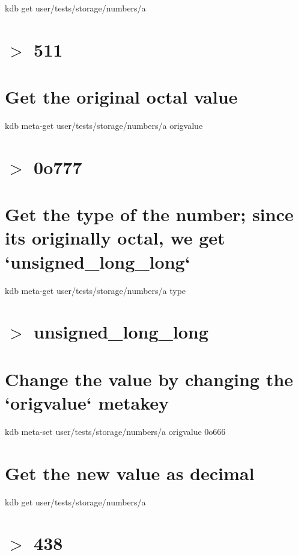 kdb get \textquotesingle{}user/tests/storage/numbers/a\textquotesingle{} \hypertarget{autotoc_md693_autotoc_md729}{}\section{$>$ 511}\label{autotoc_md693_autotoc_md729}
\hypertarget{autotoc_md693_autotoc_md730}{}\section{Get the original octal value}\label{autotoc_md693_autotoc_md730}
kdb meta-\/get \textquotesingle{}user/tests/storage/numbers/a\textquotesingle{} \textquotesingle{}origvalue\textquotesingle{} \hypertarget{autotoc_md693_autotoc_md731}{}\section{$>$ 0o777}\label{autotoc_md693_autotoc_md731}
\hypertarget{autotoc_md693_autotoc_md732}{}\section{Get the type of the number; since it\textquotesingle{}s originally octal, we get `unsigned\+\_\+long\+\_\+long`}\label{autotoc_md693_autotoc_md732}
kdb meta-\/get \textquotesingle{}user/tests/storage/numbers/a\textquotesingle{} \textquotesingle{}type\textquotesingle{} \hypertarget{autotoc_md693_autotoc_md733}{}\section{$>$ unsigned\+\_\+long\+\_\+long}\label{autotoc_md693_autotoc_md733}
\hypertarget{autotoc_md693_autotoc_md734}{}\section{Change the value by changing the `origvalue` metakey}\label{autotoc_md693_autotoc_md734}
kdb meta-\/set \textquotesingle{}user/tests/storage/numbers/a\textquotesingle{} \textquotesingle{}origvalue\textquotesingle{} \textquotesingle{}0o666\textquotesingle{}\hypertarget{autotoc_md693_autotoc_md735}{}\section{Get the new value as decimal}\label{autotoc_md693_autotoc_md735}
kdb get \textquotesingle{}user/tests/storage/numbers/a\textquotesingle{} \hypertarget{autotoc_md693_autotoc_md736}{}\section{$>$ 438}\label{autotoc_md693_autotoc_md736}

